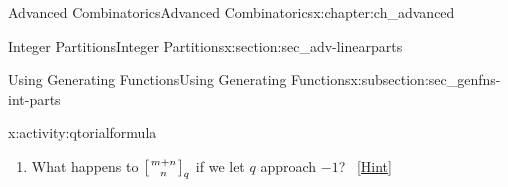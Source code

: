 \documentclass[oneside,10pt,]{book}
\numberwithin{equation}{chapter}
\newcommand{\qchoose}[2]{\left[{#1\atop#2}\right]_q}
\begin{document}
\begin{chapterptx}{Advanced Combinatorics}{}{Advanced Combinatorics}{}{}{x:chapter:ch_advanced}
\begin{sectionptx}{Integer Partitions}{}{Integer Partitions}{}{}{x:section:sec_adv-linearparts}
\begin{subsectionptx}{Using Generating Functions}{}{Using Generating Functions}{}{}{x:subsection:sec_genfns-int-parts}
\begin{activity}{}{x:activity:qtorialformula}
\begin{enumerate}[font=\bfseries,label=(\alph*),ref=\alph*]
\begin{enumerate}[label=(\roman*)]
\item{}\(\displaystyle\lim_{q\rightarrow 1} [n]_q\).%
\item{}\(\displaystyle\lim_{q\rightarrow 1} [n]!_q\).%
\item\hypertarget{x:li:q-binomial-lim}{}\(\displaystyle\lim_{q\rightarrow 1} \qchoose{m+n}{n}\).%
\end{enumerate}
Why is the limit in \hyperlink{x:li:q-binomial-lim}{Part~iii} equal to the number of partitions (of any number) with at most \(n\) parts all of size most \(m\)? Can you explain bijectively why this quantity equals the formula you got?%
\qquad~\hfill{\tiny\hyperlink{g:hint:idm8266-back}{[Hint]}}\item{}What happens to \(\qchoose{m+n}{n}\) if we let \(q\) approach \(-1\)?%
\qquad~\hfill{\tiny\hyperlink{g:hint:idm8295-back}{[Hint]}}\end{enumerate}
\end{activity}
\end{subsectionptx}
\end{sectionptx}
\end{chapterptx}
%
%
\typeout{************************************************}
\typeout{************************************************}
%
\end{document}

